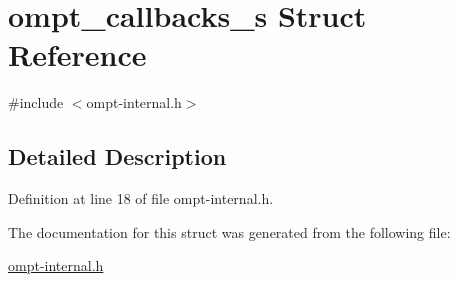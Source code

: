 \hypertarget{structompt__callbacks__s}{\section{ompt\-\_\-callbacks\-\_\-s Struct Reference}
\label{structompt__callbacks__s}
}


{\ttfamily \#include $<$ompt-\/internal.\-h$>$}



\subsection{Detailed Description}


Definition at line 18 of file ompt-\/internal.\-h.



The documentation for this struct was generated from the following file\-:\begin{DoxyCompactItemize}
\item 
\hyperlink{ompt-internal_8h}{ompt-\/internal.\-h}\end{DoxyCompactItemize}
